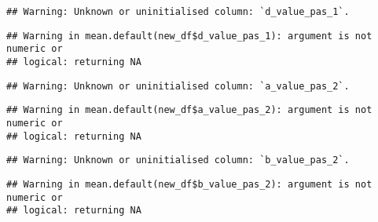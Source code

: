 \documentclass[
]{article}
\newenvironment{Shaded}{\begin{snugshade}}{\end{snugshade}}
\newcommand{\FunctionTok}[1]{\textcolor[rgb]{0.00,0.00,0.00}{#1}}
\newcommand{\NormalTok}[1]{#1}
\newcommand{\OtherTok}[1]{\textcolor[rgb]{0.56,0.35,0.01}{#1}}
\newcommand{\SpecialCharTok}[1]{\textcolor[rgb]{0.00,0.00,0.00}{#1}}
\begin{document}
\begin{verbatim}
## Warning: Unknown or uninitialised column: `d_value_pas_1`.
\end{verbatim}

\begin{verbatim}
## Warning in mean.default(new_df$d_value_pas_1): argument is not numeric or
## logical: returning NA
\end{verbatim}

\begin{Shaded}
\end{Shaded}

\begin{verbatim}
## Warning: Unknown or uninitialised column: `a_value_pas_2`.
\end{verbatim}

\begin{verbatim}
## Warning in mean.default(new_df$a_value_pas_2): argument is not numeric or
## logical: returning NA
\end{verbatim}

\begin{Shaded}
\end{Shaded}

\begin{verbatim}
## Warning: Unknown or uninitialised column: `b_value_pas_2`.
\end{verbatim}

\begin{verbatim}
## Warning in mean.default(new_df$b_value_pas_2): argument is not numeric or
## logical: returning NA
\end{verbatim}

\begin{Shaded}
\end{Shaded}
\end{document}
